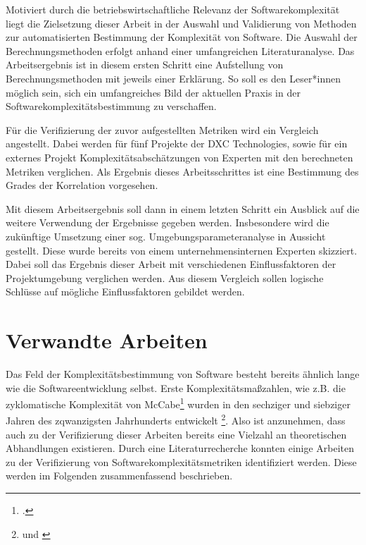 Motiviert durch die betriebswirtschaftliche Relevanz der
Softwarekomplexität liegt die Zielsetzung dieser Arbeit in der Auswahl
und Validierung von Methoden zur automatisierten Bestimmung der
Komplexität von Software. Die Auswahl der Berechnungsmethoden erfolgt
anhand einer umfangreichen Literaturanalyse. Das Arbeitsergebnis ist in
diesem ersten Schritt eine Aufstellung von Berechnungsmethoden mit
jeweils einer Erklärung. So soll es den Leser*innen möglich sein, sich
ein umfangreiches Bild der aktuellen Praxis in der
Softwarekomplexitätsbestimmung zu verschaffen.

Für die Verifizierung der zuvor aufgestellten Metriken wird ein
Vergleich angestellt. Dabei werden für fünf Projekte der DXC
Technologies, sowie für ein externes Projekt Komplexitätsabschätzungen
von Experten mit den berechneten Metriken verglichen. Als Ergebnis
dieses Arbeitsschrittes ist eine Bestimmung des Grades der Korrelation
vorgesehen.

Mit diesem Arbeitsergebnis soll dann in einem letzten Schritt ein
Ausblick auf die weitere Verwendung der Ergebnisse gegeben werden.
Insbesondere wird die zukünftige Umsetzung einer sog.
Umgebungsparameteranalyse in Aussicht gestellt. Diese wurde bereits von
einem unternehmensinternen Experten skizziert. Dabei soll das Ergebnis
dieser Arbeit mit verschiedenen Einflussfaktoren der Projektumgebung
verglichen werden. Aus diesem Vergleich sollen logische Schlüsse auf
mögliche Einflussfaktoren gebildet werden.

\section{Verwandte Arbeiten}\label{verwandte-arbeiten}

Das Feld der Komplexitätsbestimmung von Software besteht bereits ähnlich
lange wie die Softwareentwicklung selbst. Erste
Komplexitätsmaßzahlen, wie z.B. die zyklomatische Komplexität von
McCabe\footcite[Vgl. ][]{mccabeComplexityMeasure1976} wurden in den sechziger und
siebziger Jahren des zqwanzigsten Jahrhunderts entwickelt \footnote{\cite[Vgl. ][S. 25]{zuseSoftwareComplexityMeasures1991} und \cite[][]{rubeyQuantitativeMeasurementProgram1968}}. Also ist
anzunehmen, dass auch zu der Verifizierung dieser Arbeiten bereits eine
Vielzahl an theoretischen Abhandlungen existieren. Durch eine
Literaturrecherche konnten einige Arbeiten zu der Verifizierung von
Softwarekomplexitätsmetriken identifiziert werden. Diese werden im
Folgenden zusammenfassend beschrieben.

